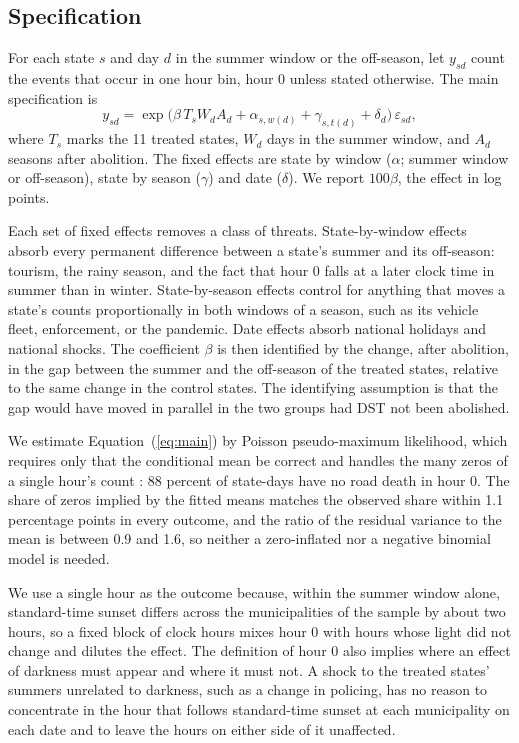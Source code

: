 \subsection{Specification}

For each state $s$ and day $d$ in the summer window or the off-season, let $y_{sd}$ count the events that occur in one hour bin, hour 0 unless stated otherwise. The main specification is
\begin{equation}\label{eq:main}
  y_{sd} = \exp\big(\beta\, T_s W_d A_d + \alpha_{s,w(d)} + \gamma_{s,t(d)} + \delta_d\big)\,\varepsilon_{sd},
\end{equation}
where $T_s$ marks the 11 treated states, $W_d$ days in the summer window, and $A_d$ seasons after abolition. The fixed effects are state by window ($\alpha$; summer window or off-season), state by season ($\gamma$) and date ($\delta$). We report $100\beta$, the effect in log points.

Each set of fixed effects removes a class of threats. State-by-window effects absorb every permanent difference between a state's summer and its off-season: tourism, the rainy season, and the fact that hour 0 falls at a later clock time in summer than in winter. State-by-season effects control for anything that moves a state's counts proportionally in both windows of a season, such as its vehicle fleet, enforcement, or the pandemic. Date effects absorb national holidays and national shocks. The coefficient $\beta$ is then identified by the change, after abolition, in the gap between the summer and the off-season of the treated states, relative to the same change in the control states. The identifying assumption is that the gap would have moved in parallel in the two groups had DST not been abolished.

We estimate Equation~(\ref{eq:main}) by Poisson pseudo-maximum likelihood, which requires only that the conditional mean be correct and handles the many zeros of a single hour's count \citep{santossilva2006log}: 88 percent of state-days have no road death in hour 0. The share of zeros implied by the fitted means matches the observed share within 1.1 percentage points in every outcome, and the ratio of the residual variance to the mean is between 0.9 and 1.6, so neither a zero-inflated nor a negative binomial model is needed. %

We use a single hour as the outcome because, within the summer window alone, standard-time sunset differs across the municipalities of the sample by about two hours, so a fixed block of clock hours mixes hour 0 with hours whose light did not change and dilutes the effect. The definition of hour 0 also implies where an effect of darkness must appear and where it must not. A shock to the treated states' summers unrelated to darkness, such as a change in policing, has no reason to concentrate in the hour that follows standard-time sunset at each municipality on each date and to leave the hours on either side of it unaffected.

